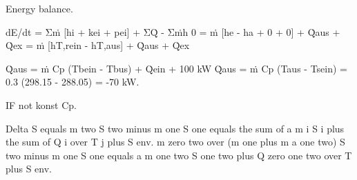 Energy balance.

dE/dt = Σṁ [hi + kei + pei] + ΣQ̇ - Σṁh  
0 = ṁ [he - ha + 0 + 0] + Q̇aus + Q̇ex  
= ṁ [hT,rein - hT,aus] + Q̇aus + Q̇ex  

Q̇aus = ṁ Cp (Tbein - Tbus) + Q̇ein + 100 kW  
Q̇aus = ṁ Cp (Taus - Tsein) = 0.3 (298.15 - 288.05) = -70 kW.

IF not konst Cp.

Delta S equals m two S two minus m one S one equals the sum of a m i S i plus the sum of Q i over T j plus S env. m zero two over (m one plus m a one two) S two minus m one S one equals a m one two S one two plus Q zero one two over T plus S env.